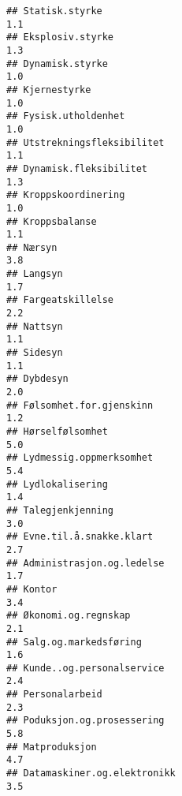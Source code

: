 \documentclass[
]{article}
\begin{document}
\begin{verbatim}
## Statisk.styrke                                                                   1.1
## Eksplosiv.styrke                                                                 1.3
## Dynamisk.styrke                                                                  1.0
## Kjernestyrke                                                                     1.0
## Fysisk.utholdenhet                                                               1.0
## Utstrekningsfleksibilitet                                                        1.1
## Dynamisk.fleksibilitet                                                           1.3
## Kroppskoordinering                                                               1.0
## Kroppsbalanse                                                                    1.1
## Nærsyn                                                                           3.8
## Langsyn                                                                          1.7
## Fargeatskillelse                                                                 2.2
## Nattsyn                                                                          1.1
## Sidesyn                                                                          1.1
## Dybdesyn                                                                         2.0
## Følsomhet.for.gjenskinn                                                          1.2
## Hørselfølsomhet                                                                  5.0
## Lydmessig.oppmerksomhet                                                          5.4
## Lydlokalisering                                                                  1.4
## Talegjenkjenning                                                                 3.0
## Evne.til.å.snakke.klart                                                          2.7
## Administrasjon.og.ledelse                                                        1.7
## Kontor                                                                           3.4
## Økonomi.og.regnskap                                                              2.1
## Salg.og.markedsføring                                                            1.6
## Kunde..og.personalservice                                                        2.4
## Personalarbeid                                                                   2.3
## Poduksjon.og.prosessering                                                        5.8
## Matproduksjon                                                                    4.7
## Datamaskiner.og.elektronikk                                                      3.5

\end{verbatim}
\end{document}
